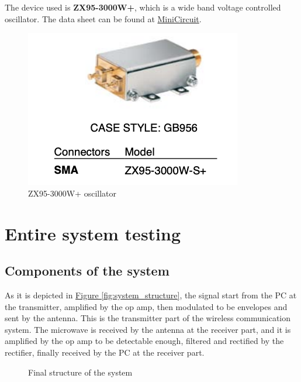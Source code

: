 \documentclass[12pt,a4paper]{report}
\begin{document}
The device used is \textbf{ZX95-3000W+}, which is a wide band voltage controlled oscillator. The data sheet can be found at \href{https://www.minicircuits.com/pdfs/ZX95-3000W+.pdf}{MiniCircuit}.

\begin{figure}[ht]
    \centerline{\includegraphics[scale=1.5]{osc}}
    \caption{ZX95-3000W+ oscillator}
    \label{fig:osc}
\end{figure}

\chapter{Entire system testing}
\section{Components of the system}
As it is depicted in \hyperref[fig:system_structure]{Figure \ref*{fig:system_structure}}, the signal start from the PC at the transmitter, amplified by the op amp, then modulated to be envelopes and sent by the antenna. This is the transmitter part of the wireless communication system. The microwave is received by the antenna at the receiver part, and it is amplified by the op amp to be detectable enough, filtered and rectified by the rectifier, finally received by the PC at the receiver part.

\begin{figure}[ht]
    
    \caption{Final structure of the system}
    \label{fig:final_structure}
\end{figure}
\end{document}

